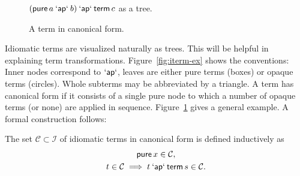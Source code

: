 \begin{figure}
\begin{minipage}[t]{0.46\textwidth}\centering
{}
\caption{$(\operatorname{\mathsf{pure}} a \mathbin{\mathsf{`ap`}} b) \mathbin{\mathsf{`ap`}} \operatorname{\mathsf{term}} c$ as a tree.}
\label{fig:iterm-ex}
\end{minipage}\hfill
\begin{minipage}[t]{0.46\textwidth}\centering
{}
\caption{A term in canonical form.}
\label{fig:iterm-nf-ex}
\end{minipage}
\end{figure}

Idiomatic terms are visualized naturally as trees.
This will be helpful in explaining term transformations.
Figure~\ref{fig:iterm-ex} shows the conventions:
Inner nodes correspond to $\mathbin{\mathsf{`ap`}}$, leaves are either pure terms (boxes) or
opaque terms (circles).
Whole subterms may be abbreviated by a triangle.
A term has canonical form if it consists of a single pure node to which a number
of opaque terms (or none) are applied in sequence.
Figure~\ref{fig:iterm-nf-ex} gives a general example.
A formal construction follows:

\begin{definition}
The set $\mathcal{C} \subset \mathcal{I}$ of idiomatic terms in canonical form
is defined inductively as
\begin{gather}
	\operatorname{\mathsf{pure}} x \in \mathcal{C}, \label{eq:cf-base}\\
	t \in \mathcal{C} \implies t \mathbin{\mathsf{`ap`}} \operatorname{\mathsf{term}} s \in \mathcal{C}. \label{eq:cf-step}
\end{gather}
\end{definition}

